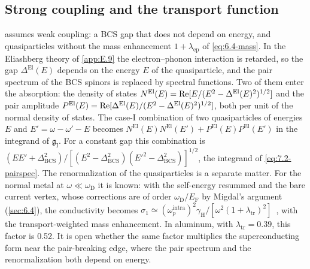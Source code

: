 \subsection{Strong coupling and the transport function}\label{sec:15.4-strong}

 assumes weak coupling: a BCS gap that does not depend on energy, and quasiparticles without the mass enhancement $1 + \lambda_{\mathrm{ep}}$ of \cref{eq:6.4-mass}. In the Eliashberg theory of \cref{app:E.9} the electron--phonon interaction is retarded, so the gap $\Delta^{\mathrm{El}}(E)$ depends on the energy $E$ of the quasiparticle, and the pair spectrum of the BCS spinors is replaced by spectral functions. Two of them enter the absorption: the density of states $N^{\mathrm{El}}(E) = \operatorname{Re}[E/(E^2 - \Delta^{\mathrm{El}}(E)^2)^{1/2}]$ and the pair amplitude $P^{\mathrm{El}}(E) = \operatorname{Re}[\Delta^{\mathrm{El}}(E)/(E^2 - \Delta^{\mathrm{El}}(E)^2)^{1/2}]$, both per unit of the normal density of states. The case-I combination of two quasiparticles of energies $E$ and $E' = \omega - \omega' - E$ becomes $N^{\mathrm{El}}(E)N^{\mathrm{El}}(E') + P^{\mathrm{El}}(E)P^{\mathrm{El}}(E')$ in the integrand of $\mathfrak{g}_{\mathrm{I}}$. For a constant gap this combination is $(EE' + \Delta_{\mathrm{BCS}}^2)/[(E^2 - \Delta_{\mathrm{BCS}}^2)(E'^2 - \Delta_{\mathrm{BCS}}^2)]^{1/2}$, the integrand of \cref{eq:7.2-pairspec}. The renormalization of the quasiparticles is a separate matter. For the normal metal at $\omega \ll \omega_{\mathrm{D}}$ it is known: with the self-energy resummed and the bare current vertex, whose corrections are of order $\omega_{\mathrm{D}}/E_{\mathrm{F}}$ by Migdal's argument (\cref{sec:6.4}), the conductivity becomes $\sigma_1 \simeq (\omega_p^{\mathrm{intra}})^2\gamma_{\mathrm{H}}/[\omega^2(1 + \lambda_{\mathrm{tr}})^2]$~\cite[Eq.~(3)]{allen2015electron}, with the transport-weighted mass enhancement. In aluminum, with $\lambda_{\mathrm{tr}} = 0.39$, this factor is 0.52. It is open whether the same factor multiplies the superconducting form near the pair-breaking edge, where the pair spectrum and the renormalization both depend on energy.

